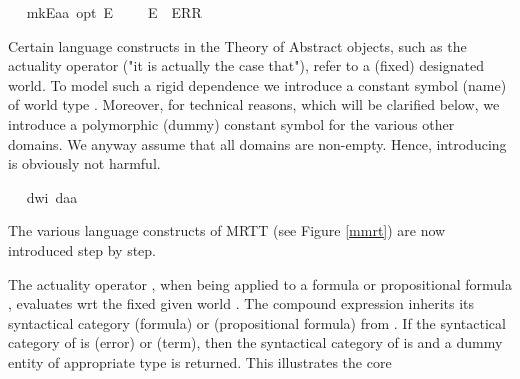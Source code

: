 \begin{isabellebody}
\ \isamarkupfalse%
\ mkE{\isacharcolon}{\isacharcolon}{\isachardoublequoteopen}{\isacharprime}a{\isasymRightarrow}{\isacharprime}a\ opt{\isachardoublequoteclose}\ {\isacharparenleft}{\isachardoublequoteopen}{\isacharunderscore}\isactrlsup E{\isachardoublequoteclose}\ {\isacharbrackleft}{}{}{}{\isacharbrackright}\ {}{}{}{\isacharparenright}\ \ \ {\isachardoublequoteopen}{\isasymphi}\isactrlsup E\ {\isasymequiv}\ ERR\ {\isasymphi}{\isachardoublequoteclose}%
\begin{isamarkuptext}%
Certain language constructs in the Theory of Abstract objects, such as the actuality operator  
  \isa{\isactrlbold {\isasymA}} ("it is actually the case that"), refer to a (fixed) designated world. To model such a 
  rigid dependence we introduce a constant symbol (name)  of world type . 
  Moreover, for technical reasons, 
  which will be clarified below, we introduce a polymorphic (dummy) constant symbol  for the various other domains. 
  We anyway assume that all domains are non-empty. Hence, introducing  is obviously not 
  harmful.%
\end{isamarkuptext}\isamarkuptrue%
\ \isamarkupfalse%
\ dw{\isacharcolon}{\isacharcolon}{\isachardoublequoteopen}i{\isachardoublequoteclose}\ da{\isacharcolon}{\isacharcolon}{\isachardoublequoteopen}{\isacharprime}a{\isachardoublequoteclose}%
\isamarkuptrue%
%
\begin{isamarkuptext}%
The various language constructs of MRTT (see Figure \ref{mmrt}) are now introduced step by step.%
\end{isamarkuptext}\isamarkuptrue%
%
\begin{isamarkuptext}%
The actuality operator \isa{\isactrlbold {\isasymA}}, when being applied to a formula or propositional formula 
  \isa{{\isasymphi}}, evaluates \isa{{\isasymphi}} wrt the fixed given world . 
  The compound expression \isa{\isactrlbold {\isasymA}{\isasymphi}} inherits its syntactical category   (formula) or
   (propositional formula) from \isa{{\isasymphi}}. If the syntactical category of  \isa{{\isasymphi}} is 
   (error) or  (term), then the syntactical category of \isa{\isactrlbold {\isasymA}{\isasymphi}} 
  is  and a dummy entity of appropriate type is returned. This illustrates the core 

\end{isamarkuptext}
\end{isabellebody}

